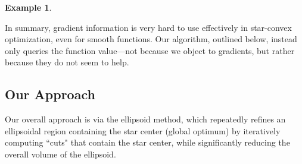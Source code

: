 \documentclass[11pt,letter]{article}
\newcounter{nTheorems}
\numberwithin{nTheorems}{section}
\newtheorem{example}[nTheorems]{Example}
\begin{document}
\begin{example}
\iffalse
We are now ready to extend  to the whole space, subject to the constraints imposed by the queries and that the star center is at .
Without loss of generality we now translate the space such that the star center is at the origin.
We use the functional form  if ,  if  and .
It is immediate that this form is always star-convex.
Observe that, since no pair of query points is collinear with the origin (star center), for each  there is only one query point constraining  (and ).
Under the above functional form, for  we have  and .
Therefore, for each query point  with , set  and .
There exists an infinitely differentiable extension of  to .
Therefore, for all query points with , we have constructed  such that  and .
Moreover,  is infinitely differentiable for all .
We can similarly construct , and since no query point is directly above the star center, we pick  arbitrarily, say .
Thus the function  is infinitely differentiable except when , which has measure 0.
Note that, since all query points  is at least  from the origin,  is at most  on the radius  circle in the original space.
Therefore, our boundedness assumption is also satisfied, thus giving us the required  that cannot be optimized by the candidate algorithm .
\fi


\end{example}


In summary, gradient information is very hard to use effectively in star-convex optimization, even for smooth functions. Our algorithm, outlined below, instead only queries the function value---not because we object to gradients, but rather because they do not seem to help.




\subsection{Our Approach}

Our overall approach is via the ellipsoid method, which repeatedly refines an ellipsoidal region containing the star center (global optimum) by iteratively computing ``cuts" that contain the star center, while significantly reducing the overall volume of the ellipsoid.
\end{document}
